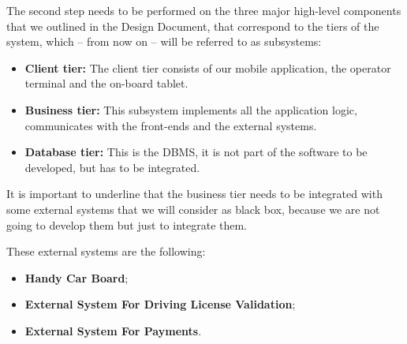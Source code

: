 The second step needs to be performed on the three major high-level components that we outlined in the Design Document, that correspond to the tiers of the system, which – from now on – will
be referred to as subsystems:
\begin{itemize}
\item \textbf{Client tier:} The client tier consists of our mobile application, the operator terminal and the on-board tablet.
\item\textbf{Business tier:} This subsystem implements all the application logic, communicates with the front-ends and the external systems.
\item \textbf{Database tier:} This is the DBMS, it is not part of the software to be developed,
but has to be integrated.
\end{itemize}
It is important to underline that the business tier needs to be integrated with some external systems that we will consider as black box, because we are not going to develop them but just to integrate them.

These external systems are the following:
\begin{itemize}
\item \textbf{Handy Car Board};
\item \textbf{External System For Driving License Validation};
\item \textbf{External System For Payments}.
\end{itemize}


